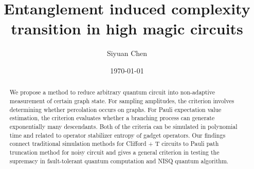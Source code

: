 \documentclass[aps,%
twocolumn,%
floatfix,%
pra,%
amsfonts,%
longbibliography,%
groupedaddress,%
superscriptaddress]{revtex4-2}%
\newcommand{\1}{\mathbbm{1}}
\begin{document}
\title{Entanglement induced complexity transition in high magic circuits}
\author{Siyuan Chen}
%


\begin{abstract}
\noindent 
We propose a method to reduce arbitrary quantum circuit into non-adaptive measurement of certain graph state. 
For sampling amplitudes, the criterion involves determining whether percolation occurs on graphs. 
For Pauli expectation value estimation, the criterion evaluates whether a branching process can generate exponentially many descendants.
Both of the criteria can be simulated in polynomial time and related to operator stabilizer entropy of gadget operators.
Our findings connect traditional simulation methods for Clifford + T circuits to Pauli path truncation method for noisy circuit and gives a general criterion in testing the supremacy in fault-tolerant quantum computation and NISQ quantum algorithm.
\end{abstract}
\date{\today}
\maketitle

\end{document}

